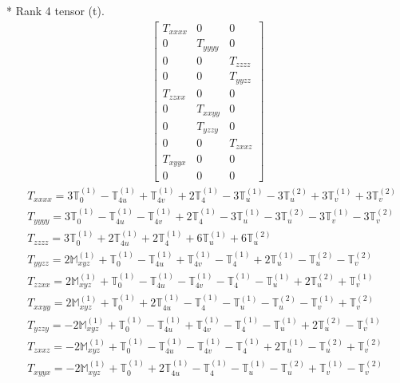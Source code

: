 \documentclass[fleqn,8pt,landscape]{jsarticle}
\begin{document}
* Rank 4 tensor (t).
\begin{align*}
\begin{bmatrix} T_{xxxx} & 0 & 0 \\ 0 & T_{yyyy} & 0 \\ 0 & 0 & T_{zzzz} \\ 0 & 0 & T_{yyzz} \\ T_{zzxx} & 0 & 0 \\ 0 & T_{xxyy} & 0 \\ 0 & T_{yzzy} & 0 \\ 0 & 0 & T_{zxxz} \\ T_{xyyx} & 0 & 0 \\ 0 & 0 & 0 \end{bmatrix}
\end{align*}
\begin{align*}
& T_{xxxx} = 3 \mathbb{T}_{0}^{(1)} - \mathbb{T}_{4u}^{(1)} + \mathbb{T}_{4v}^{(1)} + 2 \mathbb{T}_{4}^{(1)} - 3 \mathbb{T}_{u}^{(1)} - 3 \mathbb{T}_{u}^{(2)} + 3 \mathbb{T}_{v}^{(1)} + 3 \mathbb{T}_{v}^{(2)} \\
& T_{yyyy} = 3 \mathbb{T}_{0}^{(1)} - \mathbb{T}_{4u}^{(1)} - \mathbb{T}_{4v}^{(1)} + 2 \mathbb{T}_{4}^{(1)} - 3 \mathbb{T}_{u}^{(1)} - 3 \mathbb{T}_{u}^{(2)} - 3 \mathbb{T}_{v}^{(1)} - 3 \mathbb{T}_{v}^{(2)} \\
& T_{zzzz} = 3 \mathbb{T}_{0}^{(1)} + 2 \mathbb{T}_{4u}^{(1)} + 2 \mathbb{T}_{4}^{(1)} + 6 \mathbb{T}_{u}^{(1)} + 6 \mathbb{T}_{u}^{(2)} \\
& T_{yyzz} = 2 \mathbb{M}_{xyz}^{(1)} + \mathbb{T}_{0}^{(1)} - \mathbb{T}_{4u}^{(1)} + \mathbb{T}_{4v}^{(1)} - \mathbb{T}_{4}^{(1)} + 2 \mathbb{T}_{u}^{(1)} - \mathbb{T}_{u}^{(2)} - \mathbb{T}_{v}^{(2)} \\
& T_{zzxx} = 2 \mathbb{M}_{xyz}^{(1)} + \mathbb{T}_{0}^{(1)} - \mathbb{T}_{4u}^{(1)} - \mathbb{T}_{4v}^{(1)} - \mathbb{T}_{4}^{(1)} - \mathbb{T}_{u}^{(1)} + 2 \mathbb{T}_{u}^{(2)} + \mathbb{T}_{v}^{(1)} \\
& T_{xxyy} = 2 \mathbb{M}_{xyz}^{(1)} + \mathbb{T}_{0}^{(1)} + 2 \mathbb{T}_{4u}^{(1)} - \mathbb{T}_{4}^{(1)} - \mathbb{T}_{u}^{(1)} - \mathbb{T}_{u}^{(2)} - \mathbb{T}_{v}^{(1)} + \mathbb{T}_{v}^{(2)} \\
& T_{yzzy} = - 2 \mathbb{M}_{xyz}^{(1)} + \mathbb{T}_{0}^{(1)} - \mathbb{T}_{4u}^{(1)} + \mathbb{T}_{4v}^{(1)} - \mathbb{T}_{4}^{(1)} - \mathbb{T}_{u}^{(1)} + 2 \mathbb{T}_{u}^{(2)} - \mathbb{T}_{v}^{(1)} \\
& T_{zxxz} = - 2 \mathbb{M}_{xyz}^{(1)} + \mathbb{T}_{0}^{(1)} - \mathbb{T}_{4u}^{(1)} - \mathbb{T}_{4v}^{(1)} - \mathbb{T}_{4}^{(1)} + 2 \mathbb{T}_{u}^{(1)} - \mathbb{T}_{u}^{(2)} + \mathbb{T}_{v}^{(2)} \\
& T_{xyyx} = - 2 \mathbb{M}_{xyz}^{(1)} + \mathbb{T}_{0}^{(1)} + 2 \mathbb{T}_{4u}^{(1)} - \mathbb{T}_{4}^{(1)} - \mathbb{T}_{u}^{(1)} - \mathbb{T}_{u}^{(2)} + \mathbb{T}_{v}^{(1)} - \mathbb{T}_{v}^{(2)}
\end{align*}
\end{document}
